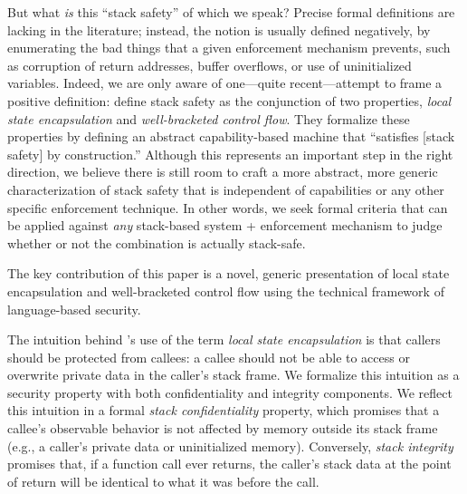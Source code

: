 \documentclass[acmsmall,review,anonymous]{acmart}\settopmatter{printfolios=true,printccs=false,printacmref=false}
\begin{document}
But what {\em is} this ``stack safety'' of which we speak? Precise formal
definitions are lacking in the literature; instead, the notion
is usually defined negatively, by enumerating the bad things that a given
enforcement mechanism
prevents, such as corruption of return addresses, buffer overflows, or
use of uninitialized variables.
Indeed, we are only aware of one---quite recent---attempt to frame a
positive definition:
\citet{Skorstengaard+19} define stack safety as
the conjunction of two properties, {\em local state encapsulation} and {\em
  well-bracketed control flow}.
They formalize these properties by defining an abstract capability-based machine
that ``satisfies [stack safety] by construction.''
%
Although this represents an important step in the right direction, we believe
there is still room to craft a more abstract, more generic characterization
of stack safety that is independent of capabilities or any other specific
enforcement
technique.  In other words, we seek formal criteria that can be applied
against \emph{any} stack-based system + enforcement mechanism to judge
whether or not the combination is actually stack-safe.

\iflater
{}
\fi
The key contribution of this paper is a novel, generic presentation of
local state encapsulation and well-bracketed control flow using the
technical framework of language-based security.

The intuition behind \citeauthor{Skorstengaard+19}'s use of the term {\em
  local state encapsulation} is that callers should be protected from
callees: a callee should not be able to access or overwrite private data
in the caller's stack frame. We formalize this intuition as a security
property with both confidentiality and integrity components.
%
We reflect this intuition in a formal
{\em stack confidentiality} property, which promises that a callee's
observable behavior is not affected by memory outside its stack frame
(e.g., a caller's private data or uninitialized memory).  Conversely, {\em stack
  integrity} promises that, if a function call ever returns, the caller's
stack data at the point of return will be identical to what it was before
the call.

\iflater
{}
\fi
\end{document}
